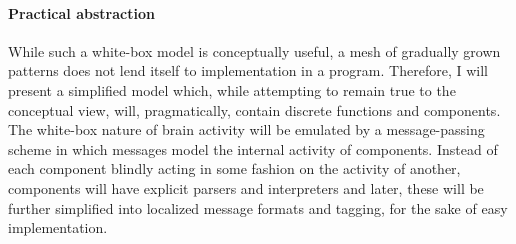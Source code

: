 \paragraph{Practical abstraction}

While such a white-box model is conceptually useful, a mesh of gradually grown patterns does not lend itself to implementation in a program. Therefore, I will present a simplified model which, while attempting to remain true to the conceptual view, will, pragmatically, contain discrete functions and components. The white-box nature of brain activity will be emulated by a message-passing scheme in which messages model the internal activity of components. Instead of each component blindly acting in some fashion on the activity of another, components will have explicit parsers and interpreters and later, these will be further simplified into localized message formats and tagging, for the sake of easy implementation.